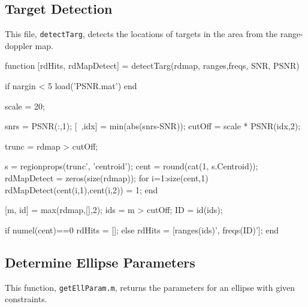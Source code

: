 \documentclass[12pt,openany,a4paper]{book}
\begin{document}
\subsection{Target Detection}
This file, \verb+detectTarg+, detects the locations of targets in the area from the range-doppler map.

\begin{spverbatim}
function [rdHits, rdMapDetect] = detectTarg(rdmap, ranges,freqs, SNR, PSNR)
%
%

if nargin < 5
    load('PSNR.mat')
end

scale = 20; %

snrs = PSNR(:,1);
[~,idx] = min(abs(snrs-SNR));
cutOff = scale * PSNR(idx,2);

trunc = rdmap > cutOff;

s  = regionprops(trunc', 'centroid');
cent = round(cat(1, s.Centroid));
rdMapDetect = zeros(size(rdmap));
for i=1:size(cent,1)
    rdMapDetect(cent(i,1),cent(i,2)) = 1;
end

[m, id] = max(rdmap,[],2);
ids = m > cutOff;
ID = id(ids);

if numel(cent)==0
    rdHits = [];
else
    rdHits = [ranges(ids)', freqs(ID)'];
end

\end{spverbatim}

\subsection{Determine Ellipse Parameters}
This function, \verb+getEllParam.m+, returns the parameters for an ellipse with given constraints.
\end{document}
